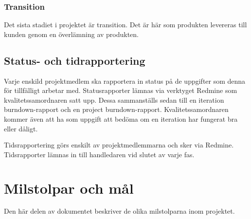 \subsubsection*{Transition}
Det sista stadiet i projektet är transition. Det är här som produkten levereras till kunden genom en överlämning av produkten.

\subsection{Status- och tidrapportering}
Varje enskild projektmedlem ska rapportera in status på de uppgifter som denna för tillfälligt arbetar med. Statusrapporter lämnas via verktyget Redmine som kvalitetssamordnaren satt upp. Dessa sammanställs sedan till en iteration burndown-rapport och en project burndown-rapport. Kvalitetssamordnaren kommer även att ha som uppgift att bedöma om en iteration har fungerat bra eller dåligt.

Tidsrapportering görs enskilt av projektmedlemmarna och sker via Redmine. Tidsrapporter lämnas in till handledaren vid slutet av varje fas.

\newpage

\section{Milstolpar och mål}
Den här delen av dokumentet beskriver de olika milstolparna inom projektet.

